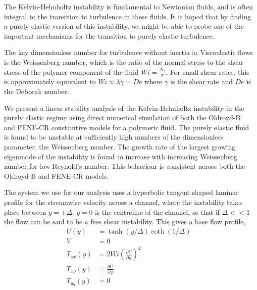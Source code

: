 \documentclass{article}
\newcommand{\dy}[1]{\frac{\partial #1}{\partial y}}
\begin{document}
The Kelvin-Helmholtz instability is fundamental to Newtonian fluids, and is often integral to the transition to turbulence in these fluids. It is hoped that by finding a purely elastic version of this instability, we might be able to probe one of the important mechanisms for the transition to purely elastic turbulence.

The key dimensionless number for turbulence without inertia in Viscoelastic flows is the Weissenberg number, which is the ratio of the normal stress to the shear stress of the polymer component of the fluid $Wi = \frac{N_{1}}{\sigma}$. For small shear rates, this is approximately equivalent to $Wi \approx \lambda \dot{\gamma} = De$ where $\dot{\gamma}$ is the shear rate and $De$ is the Deborah number. 

We present a linear stability analysis of the Kelvin-Helmholtz instability in the purely elastic regime using direct numerical simulation of both the Oldroyd-B and FENE-CR constitutive models for a polymeric fluid. The purely elastic fluid is found to be unstable at sufficiently high numbers of the dimensionless parameter, the Weissenberg number. The growth rate of the largest growing eigenmode of the instability is found to increase with increasing Weissenberg number for low Reynold's number. This behaviour is consistent across both the Oldroyd-B and FENE-CR models.

The system we use for our analysis uses a hyperbolic tangent shaped laminar profile for the streamwise velocity across a channel, where the instability takes place between $y = \pm \Delta$. $y=0$ is the centreline of the channel, so that if $\Delta << 1$ the flow can be said to be a free shear instability. This gives a base flow profile,
\begin{align}
    U(y) &= \tanh \left( y/\Delta \right) \coth \left( 1/\Delta \right) \nonumber\\
    V &= 0 \nonumber \\
    T_{xx}(y) &= 2 Wi \left( \dy{U} \right)^{2} \nonumber \\
    T_{xy}(y) &= \dy{U} \nonumber \\
    T_{yy}(y) &= 0 \nonumber 
    \label{eq:KH_laminar_profile}
\end{align}
\end{document}
